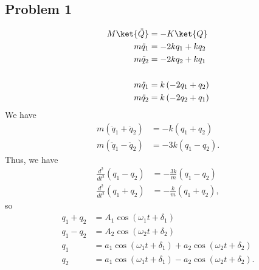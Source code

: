 \documentclass[10pt]{mypackage}
\begin{document}
\subsection{Problem 1}%
\begin{align*}
  M\ket{\ddot{Q}} &= -K\ket{Q}\\
  m\ddot{q}_1 &= -2kq_1 + kq_2\\
  m\ddot{q}_2 &= -2kq_2 + kq_1\\
  \\
  m\ddot{q}_1 &= k\left(-2q_1 + q_2\right)\\
  m\ddot{q}_2 &= k\left(-2q_2 + q_1\right)
\end{align*}
We have
\begin{align*}
  m\left(\ddot{q}_1 + \ddot{q}_2\right) &= -k\left(q_1 + q_2\right)\\
  m\left(\ddot{q}_1 - \ddot{q}_2\right) &= -3k\left(q_1 - q_2\right).
\end{align*}
Thus, we have
\begin{align*}
  \frac{d^2}{dt^2} \left(q_1 - q_2\right) &= -\frac{3k}{m}\left(q_1 - q_2\right)\\
  \frac{d^2}{dt^2} \left(q_1 + q_2\right) &= -\frac{k}{m}\left(q_1 + q_2\right),
\end{align*}
so
\begin{align*}
  q_1 + q_2 &= A_1\cos\left(\omega_1t + \delta_1\right)\\
  q_1 - q_2 &= A_2\cos\left(\omega_2 t + \delta_2\right)\\
  q_1 &= a_1\cos\left(\omega_1 t + \delta_1\right) + a_2\cos\left(\omega_2 t + \delta_2\right)\\
  q_2 &= a_1\cos\left(\omega_1 t + \delta_1\right) - a_2\cos\left(\omega_2 t + \delta_2\right).
\end{align*}
\end{document}
